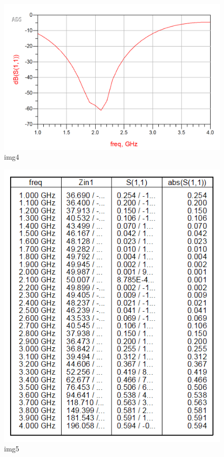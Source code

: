 \documentclass[11pt]{article}
\begin{document}
    \begin{figure}
\centering
\includegraphics{media/2.1-corrigido.png}
\caption{img4}
\end{figure}

    \begin{figure}
\centering
\includegraphics{media/2.2-corrigido.png}
\caption{img5}
\end{figure}
\end{document}
